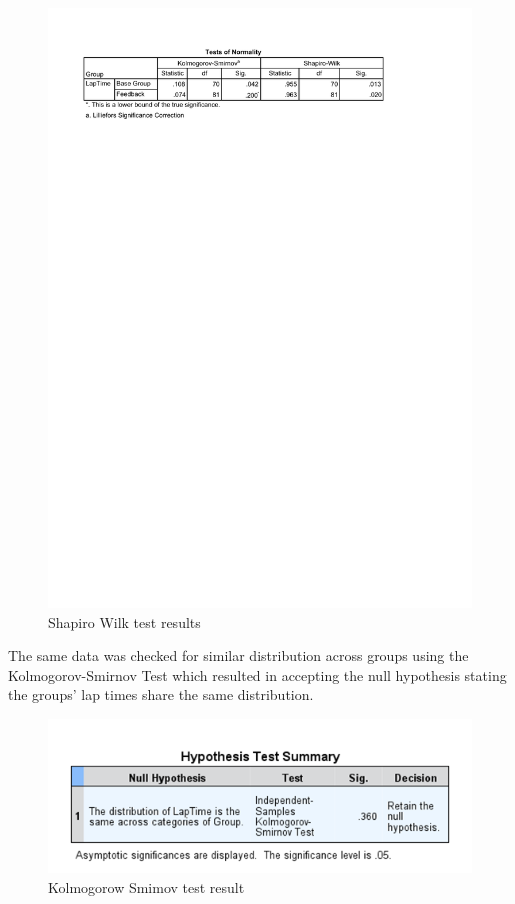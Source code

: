 \begin{figure}[!htb]
	\centering
	\includegraphics[width=\textwidth]{charts/shapiroWilkResults.pdf}
	\caption[Shapiro Wilk]{Shapiro Wilk test results}
	\label{fig:chart-shapiroWilk}
\end{figure}

The same data was checked for similar distribution across groups using the Kolmogorov-Smirnov Test which resulted in accepting the null hypothesis stating the groups' lap times share the same distribution.

\begin{figure}[!htb]
	\centering
	\includegraphics[width=\textwidth]{images/KolmogorowSmimov.png}
	\caption[Kolmogorow Smimov Test]{Kolmogorow Smimov test result}
	\label{fig:chart-KolmogorowSmimov}
\end{figure}

